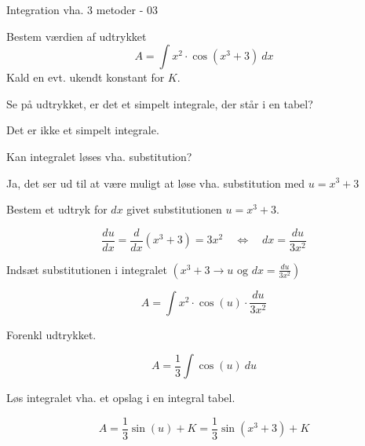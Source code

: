 \documentclass{article}
\begin{document}
\begin{exercise}{Integration vha. 3 metoder - 03}

Bestem værdien af udtrykket
\[
A = \int x^2 \cdot \cos(x^3 + 3) \ dx
\]
Kald en evt. ukendt konstant for $K$.



\hint
Se på udtrykket, er det et simpelt integrale, der står i en tabel?

\hint
Det er ikke et simpelt integrale.

\hint
Kan integralet løses vha. substitution?

\hint
Ja, det ser ud til at være muligt at løse vha. substitution med $u=x^3 + 3$

\hint
Bestem et udtryk for $dx$ givet substitutionen $u=x^3 + 3$.

\hint
\[
\frac{du}{dx} = \frac{d}{dx} \left(x^3 + 3 \right) = 3x^2 \quad \Leftrightarrow \quad dx = \frac{du}{3x^2}
\]

\hint
Indsæt substitutionen i integralet $\left(x^3 + 3 \rightarrow u \textrm{ og } dx = \frac{du}{3x^2} \right)$

\hint
\[
A = \int x^2 \cdot \cos(u) \cdot \frac{du}{3x^2}
\]

\hint
Forenkl udtrykket.

\hint
\[
A= \frac{1}{3} \int \cos(u) \ du
\]

\hint
Løs integralet vha. et opslag i en integral tabel.

\hint
\[
A = \frac{1}{3} \sin(u) + K = \frac{1}{3} \sin(x^3 + 3) + K
\]


\end{exercise}

\newpage
\end{document}
